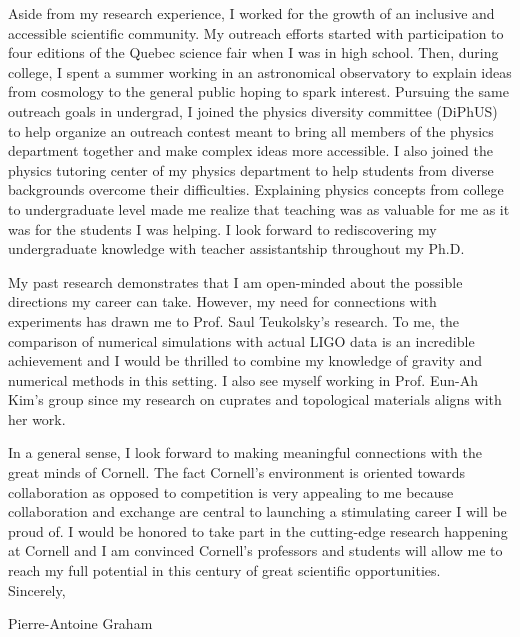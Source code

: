 \documentclass[12pt]{article}
\begin{document}
Aside from my research experience, I worked for the growth of an inclusive and accessible scientific community. My outreach efforts started with participation to four editions of the Quebec science fair when I was in high school. Then, during college, I spent a summer working in an astronomical observatory to explain ideas from cosmology to the general public hoping to spark interest. Pursuing the same outreach goals in undergrad, I joined the physics diversity committee (DiPhUS) to help organize an outreach contest meant to bring all members of the physics department together and make complex ideas more accessible. I also joined the physics tutoring center of my physics department to help students from diverse backgrounds overcome their difficulties. Explaining physics concepts from college to undergraduate level made me realize that teaching was as valuable for me as it was for the students I was helping. I look forward to rediscovering my undergraduate knowledge with teacher assistantship throughout my Ph.D.  

\vspace{0.4cm}

My past research demonstrates that I am open-minded about the possible directions my career can take. However, my need for connections with experiments has drawn me to Prof. Saul Teukolsky's research. To me, the comparison of numerical simulations with actual LIGO data is an incredible achievement and I would be thrilled to combine my knowledge of gravity and numerical methods in this setting. I also see myself working in Prof. Eun-Ah Kim's group since my research on cuprates and topological materials aligns with her work.  

\vspace{0.4cm}

In a general sense, I look forward to making meaningful connections with the great minds of Cornell. The fact Cornell's environment is oriented towards collaboration as opposed to competition is very appealing to me because collaboration and exchange are central to launching a stimulating career I will be proud of. I would be honored to take part in the cutting-edge research happening at Cornell and I am convinced Cornell's professors and students will allow me to reach my full potential in this century of great scientific opportunities.\\
\vspace{0.4cm}
Sincerely,

\vspace{0.4cm}
Pierre-Antoine Graham
\end{document}
